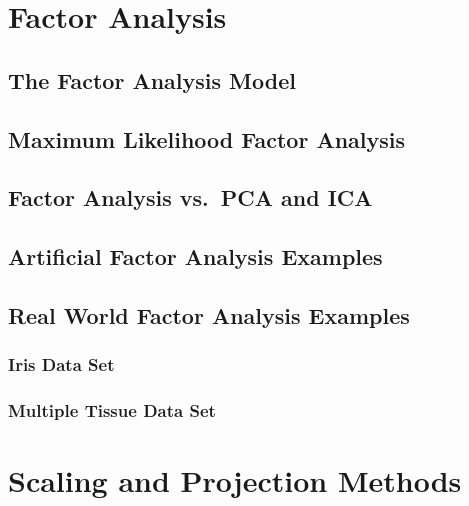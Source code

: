 \documentclass[11pt, oneside]{book}
\begin{document}
\chapter{Factor Analysis}

\section{The Factor Analysis Model}


\section{Maximum Likelihood Factor Analysis}


\section{Factor Analysis vs.\ PCA and ICA}


\section{Artificial Factor Analysis Examples}


\section{Real World Factor Analysis Examples}

\subsection{Iris Data Set}


\subsection{Multiple Tissue Data Set}



\chapter{Scaling and Projection Methods}
\end{document}
